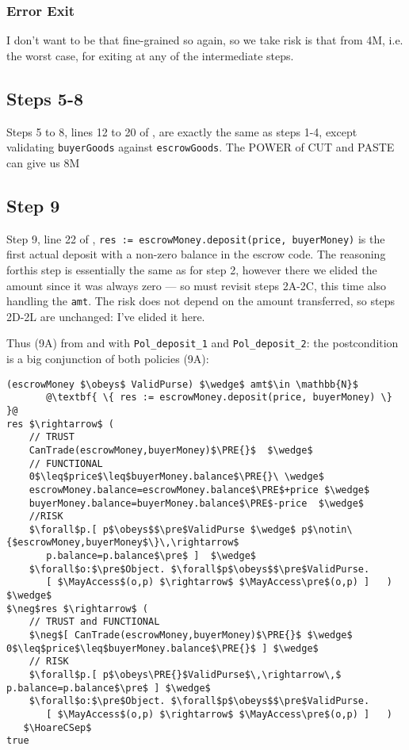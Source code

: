 \subsubsection{Error Exit}

I don't want to be that fine-grained so again, so we take risk is that from 4M, i.e. the worst case,
for exiting at any of the intermediate steps.

\subsection{Steps 5-8}

Steps 5 to 8, lines 12 to 20 of \bothfigs, are exactly the same as
steps 1-4, except validating \lstinline+buyerGoods+ against
\lstinline+escrowGoods+.  The POWER of CUT and PASTE can give us 8M


\subsection{Step 9}

Step 9, line 22 of \bothfigs,
%
\lstinline+res := escrowMoney.deposit(price, buyerMoney)+
%
is the first actual deposit with a non-zero balance in the escrow
code.  The reasoning forthis step is essentially the same as for step
2, however there we elided the amount since it was always zero --- so
must revisit steps 2A-2C, this time also handling the \lstinline+amt+.
The risk does not depend on the amount transferred, so steps 2D-2L are
unchanged: I've elided it here.

Thus (9A) from  and  with \lstinline+Pol_deposit_1+ and \lstinline+Pol_deposit_2+: the postcondition is a big conjunction of both policies (9A):

\begin{lstlisting}[escapechar=@]
(escrowMoney $\obeys$ ValidPurse) $\wedge$ amt$\in \mathbb{N}$
       @\textbf{ \{ res := escrowMoney.deposit(price, buyerMoney) \} }@
res $\rightarrow$ (
    // TRUST
    CanTrade(escrowMoney,buyerMoney)$\PRE{}$  $\wedge$
    // FUNCTIONAL
    0$\leq$price$\leq$buyerMoney.balance$\PRE{}\ \wedge$
    escrowMoney.balance=escrowMoney.balance$\PRE$+price $\wedge$
    buyerMoney.balance=buyerMoney.balance$\PRE$-price  $\wedge$
    //RISK
    $\forall$p.[ p$\obeys$$\pre$ValidPurse $\wedge$ p$\notin\{$escrowMoney,buyerMoney$\}\,\rightarrow$
       p.balance=p.balance$\pre$ ]  $\wedge$
    $\forall$o:$\pre$Object. $\forall$p$\obeys$$\pre$ValidPurse.
       [ $\MayAccess$(o,p) $\rightarrow$ $\MayAccess\pre$(o,p) ]   )
$\wedge$
$\neg$res $\rightarrow$ (
    // TRUST and FUNCTIONAL
    $\neg$[ CanTrade(escrowMoney,buyerMoney)$\PRE{}$ $\wedge$ 0$\leq$price$\leq$buyerMoney.balance$\PRE{}$ ] $\wedge$
    // RISK
    $\forall$p.[ p$\obeys\PRE{}$ValidPurse$\,\rightarrow\,$ p.balance=p.balance$\pre$ ] $\wedge$
    $\forall$o:$\pre$Object. $\forall$p$\obeys$$\pre$ValidPurse.
       [ $\MayAccess$(o,p) $\rightarrow$ $\MayAccess\pre$(o,p) ]   )
   $\HoareCSep$
true
\end{lstlisting}



